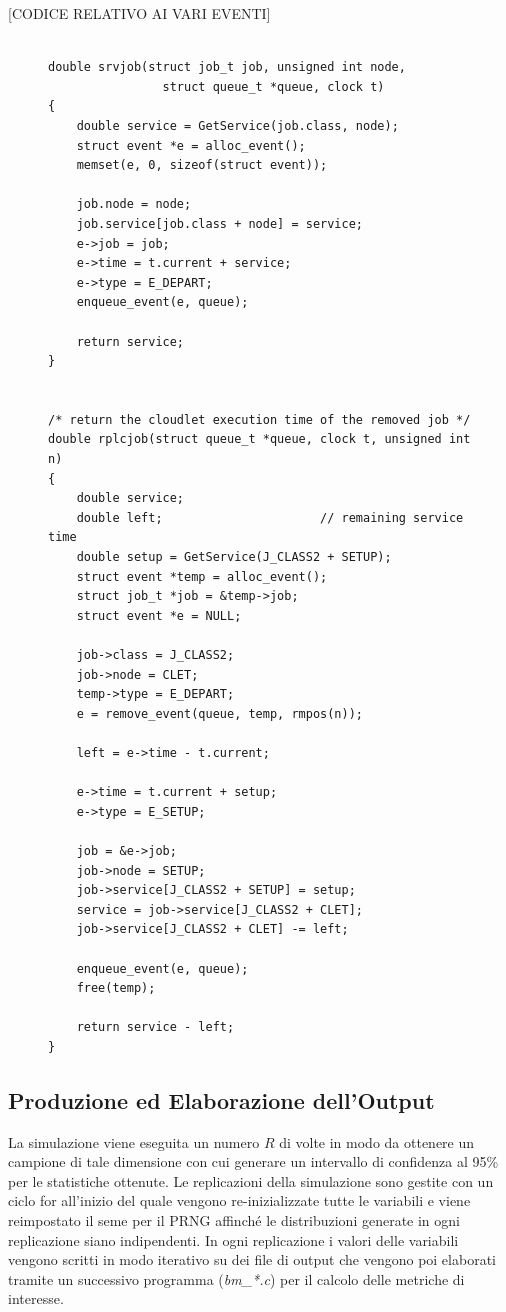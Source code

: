 [CODICE RELATIVO AI VARI EVENTI]

%
\begin{figure}[!h]
\begin{lstlisting}[title=cloudq.c]

double srvjob(struct job_t job, unsigned int node,
                struct queue_t *queue, clock t)
{
    double service = GetService(job.class, node);
    struct event *e = alloc_event();
    memset(e, 0, sizeof(struct event));

    job.node = node;
    job.service[job.class + node] = service;
    e->job = job;
    e->time = t.current + service;
    e->type = E_DEPART;
    enqueue_event(e, queue);

    return service;
}


/* return the cloudlet execution time of the removed job */
double rplcjob(struct queue_t *queue, clock t, unsigned int n)
{
    double service;
    double left;                      // remaining service time
    double setup = GetService(J_CLASS2 + SETUP);
    struct event *temp = alloc_event();
    struct job_t *job = &temp->job;
    struct event *e = NULL;
    
    job->class = J_CLASS2;
    job->node = CLET;
    temp->type = E_DEPART;
    e = remove_event(queue, temp, rmpos(n));
    
    left = e->time - t.current;     

    e->time = t.current + setup;
    e->type = E_SETUP;

    job = &e->job;
    job->node = SETUP;
    job->service[J_CLASS2 + SETUP] = setup;
    service = job->service[J_CLASS2 + CLET];
    job->service[J_CLASS2 + CLET] -= left;

    enqueue_event(e, queue);
    free(temp);

    return service - left;
}
\end{lstlisting}
\end{figure}
%
%
\subsection{Produzione ed Elaborazione dell'Output}
La simulazione viene eseguita un numero $R$ di volte in modo da ottenere un
campione di tale dimensione con cui generare un intervallo di confidenza al 95\%
per le statistiche ottenute.  Le replicazioni della simulazione sono gestite con
un ciclo for all’inizio del quale vengono re-inizializzate tutte le variabili e
viene reimpostato il seme per il PRNG affinché le distribuzioni generate in ogni
replicazione siano indipendenti. In ogni replicazione i valori delle variabili
vengono scritti in modo iterativo su dei file di output che vengono poi
elaborati tramite un successivo programma (\emph{bm\_*.c}) per il calcolo delle
metriche di interesse.
